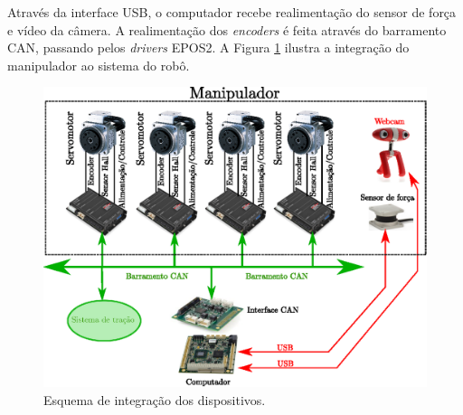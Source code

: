 Através da interface USB, o computador recebe realimentação do sensor de força e vídeo da câmera. A realimentação dos \textit{encoders} é feita através do barramento CAN, passando pelos \textit{drivers} EPOS2. A Figura \ref{fig:integration} ilustra a integração do manipulador ao sistema do robô.

\begin{figure}[!ht]
\centering
  \includegraphics[width=0.8\linewidth]{./img/integration_diagram}
  \caption{Esquema de integração dos dispositivos.}
  \label{fig:integration}
\end{figure}%